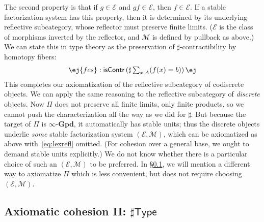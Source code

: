 \documentclass[copyright,12pt]{eptcs}
\makeatletter
\newcommand{\type}{\ensuremath{\mathsf{Type}}\xspace}
\newcommand{\ig}{\ensuremath{\infty\text{-}\mathbf{Gpd}}\xspace}
\newcommand{\io}{\ensuremath{(\infty,1)}}
\newcommand{\E}{\ensuremath{\mathcal{E}}\xspace}
\newcommand{\M}{\ensuremath{\mathcal{M}}\xspace}
\def\jd#1{\@jd#1\ej}
\def\@jd#1|-#2\ej{\@@jd#1,,\;\vdash\;\left(#2\right)}
\def\@@jd#1,{\@ifmtarg{#1}{\let\next=\relax}{\left(#1\right)\let\next=\@@@jd}\next}
\def\@@@jd#1,{\@ifmtarg{#1}{\let\next=\relax}{,\,\left(#1\right)\let\next=\@@@jd}\next}
\makeatother
\begin{document}
The second property is that if $g\in\E$ and $g f \in\E$, then $f\in \E$.
If a stable factorization system has this property, then it is determined by its underlying reflective subcategory, whose reflector must preserve finite limits.
(\E is the class of morphisms inverted by the reflector, and \M is defined by pullback as above.)
We can state this in type theory as the preservation of $\sharp$-contractibility by homotopy fibers:
\begin{multline}\label{eq:lexrefl}
  \jd{\mathsf{acs}:\mathsf{isContr}(\sharp A), \mathsf{bcs}:\mathsf{isContr}(\sharp B),
    f:A\to B, b:B |- \mathsf{fcs} : \mathsf{isContr}\left(\sharp \textstyle\sum_{x:A}(f(x)=b)\right)}
\end{multline}
This completes our axiomatization of the reflective subcategory of codiscrete objects.
%
We can apply the same reasoning to the reflective subcategory of \emph{discrete} objects.
Now $\Pi$ does not preserve all finite limits, only finite products, so we cannot push the characterization all the way as we did for $\sharp$.
But because the target of $\Pi$ is \ig, it automatically has stable units; thus the discrete objects underlie \emph{some} stable factorization system $(\E,\M)$, which can be axiomatized as above with~\eqref{eq:lexrefl} omitted.
(For cohesion over a general base, we ought to demand stable units explicitly.)
%
We do not know whether there is a particular choice of such an $(\E,\M)$ to be preferred.
In \S\ref{sec:axiomatic-cohesion-ii}, we will mention a different way to axiomatize $\Pi$ which is less convenient, but does not require choosing $(\E,\M)$.


\subsection{Axiomatic cohesion II: $\sharp\type$}
\label{sec:axiomatic-cohesion-ii}
\end{document}
